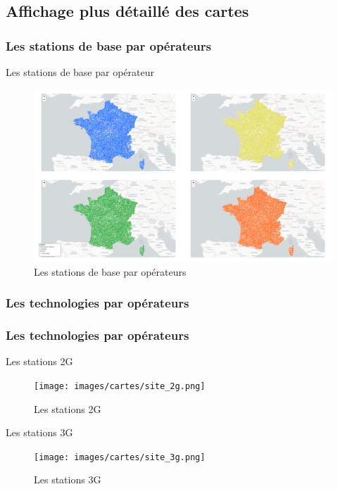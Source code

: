 \subsection{Affichage plus détaillé des cartes}
\insertsubsectionframe

\subsubsection{Les stations de base par opérateurs}
\begin{frame}{Les stations de base par opérateur}
    \begin{figure}
        \includegraphics[width=0.9\paperheight]{images/cartes/subplots-providers.png}
        \caption{\label{fig:sp-prov}Les stations de base par opérateurs}
    \end{figure}
\end{frame}


\subsubsection{Les technologies par opérateurs}
\subsubsection{Les technologies par opérateurs}
\begin{frame}{Les stations 2G}
    \begin{figure}
        \texttt{[image: images/cartes/site\_2g.png]}
        \caption{\label{fig:sp-2g}Les stations 2G}
    \end{figure}
\end{frame}

\begin{frame}{Les stations 3G}
    \begin{figure}
        \texttt{[image: images/cartes/site\_3g.png]}
        \caption{\label{fig:sp-3g}Les stations 3G}
    \end{figure}
\end{frame}

